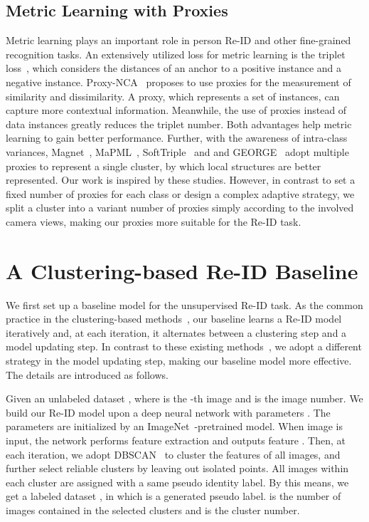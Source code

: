 \documentclass[letterpaper]{article} \usepackage{aaai21}  \usepackage{times}  \usepackage{helvet} \usepackage{courier}  \usepackage[hyphens]{url}  \usepackage{graphicx} \usepackage{subcaption}
\begin{document}
\subsection{Metric Learning with Proxies}
Metric learning plays an important role in person Re-ID and other fine-grained recognition tasks. An extensively utilized loss for metric learning is the triplet loss~\cite{hermans2017defense}, which considers the distances of an anchor to a positive instance and a negative instance. Proxy-NCA~\cite{Attias2017proxy} proposes to use proxies for the measurement of similarity and dissimilarity. A proxy, which represents a set of instances, can capture more contextual information. Meanwhile, the use of proxies instead of data instances greatly reduces the triplet number. Both advantages help metric learning to gain better performance. Further, with the awareness of intra-class variances, Magnet~\cite{Rippel2016multi-center}, MaPML~\cite{Qian2018proxy}, SoftTriple~\cite{qian2019softtriple} and and GEORGE~\cite{sohoni2020no} adopt multiple proxies to represent a single cluster, by which local structures are better represented. Our work is inspired by these studies. However, in contrast to set a fixed number of proxies for each class or design a complex adaptive strategy, we split a cluster into a variant number of proxies simply according to the involved camera views, making our proxies more suitable for the Re-ID task.  




\section{A Clustering-based Re-ID Baseline}\label{sec:baseline}
We first set up a baseline model for the unsupervised Re-ID task. As the common practice in the clustering-based methods~\cite{unsup_clustering,lin2019aBottom,zeng2020hierarchical}, our baseline learns a Re-ID model iteratively and, at each iteration, it alternates between a clustering step and a model updating step. In contrast to these existing methods~\cite{unsup_clustering,lin2019aBottom,zeng2020hierarchical}, we adopt a different strategy in the model updating step, making our baseline model more effective. The details are introduced as follows. 

Given an unlabeled dataset , where  is the -th image and  is the image number. We build our Re-ID model upon a deep neural network  with parameters . The parameters are initialized by an ImageNet~\cite{krizhevsky2012imagenet}-pretrained model. When image  is input, the network performs feature extraction and outputs feature . Then, at each iteration, we adopt DBSCAN~\cite{ester1996density} to cluster the features of all images, and further select reliable clusters by leaving out isolated points. All images within each cluster are assigned with a same pseudo identity label. By this means, we get a labeled dataset , in which  is a generated pseudo label.  is the number of images contained in the selected clusters and  is the cluster number. 
\end{document}
